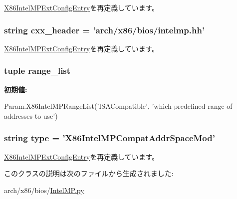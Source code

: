 \hyperlink{classIntelMP_1_1X86IntelMPExtConfigEntry_a58cd55cd4023648e138237cfc0822ae3}{X86IntelMPExtConfigEntry}を再定義しています。\hypertarget{classIntelMP_1_1X86IntelMPCompatAddrSpaceMod_a17da7064bc5c518791f0c891eff05fda}{
\subsubsection[{cxx\_\-header}]{\setlength{\rightskip}{0pt plus 5cm}string {\bf cxx\_\-header} = 'arch/x86/bios/intelmp.hh'}}
\label{classIntelMP_1_1X86IntelMPCompatAddrSpaceMod_a17da7064bc5c518791f0c891eff05fda}


\hyperlink{classIntelMP_1_1X86IntelMPExtConfigEntry_a17da7064bc5c518791f0c891eff05fda}{X86IntelMPExtConfigEntry}を再定義しています。\hypertarget{classIntelMP_1_1X86IntelMPCompatAddrSpaceMod_a813ba1f333443d7edeef6adeefe0dbd4}{
\subsubsection[{range\_\-list}]{\setlength{\rightskip}{0pt plus 5cm}tuple {\bf range\_\-list}}}
\label{classIntelMP_1_1X86IntelMPCompatAddrSpaceMod_a813ba1f333443d7edeef6adeefe0dbd4}
{\bfseries 初期値:}
\begin{DoxyCode}
Param.X86IntelMPRangeList('ISACompatible',
            'which predefined range of addresses to use')
\end{DoxyCode}
\hypertarget{classIntelMP_1_1X86IntelMPCompatAddrSpaceMod_acce15679d830831b0bbe8ebc2a60b2ca}{
\subsubsection[{type}]{\setlength{\rightskip}{0pt plus 5cm}string {\bf type} = '{\bf X86IntelMPCompatAddrSpaceMod}'}}
\label{classIntelMP_1_1X86IntelMPCompatAddrSpaceMod_acce15679d830831b0bbe8ebc2a60b2ca}


\hyperlink{classIntelMP_1_1X86IntelMPExtConfigEntry_acce15679d830831b0bbe8ebc2a60b2ca}{X86IntelMPExtConfigEntry}を再定義しています。

このクラスの説明は次のファイルから生成されました:\begin{DoxyCompactItemize}
\item 
arch/x86/bios/\hyperlink{IntelMP_8py}{IntelMP.py}\end{DoxyCompactItemize}
